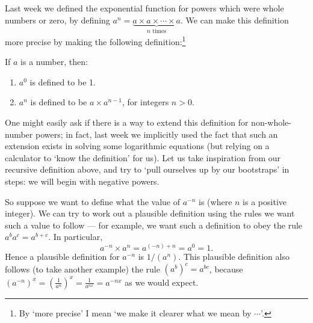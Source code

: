 



Last week we defined the exponential function for powers which were whole numbers or zero, by
defining $ a^n = \underbrace{a \times a \times \cdots \times a}_{n \text{ times}} $. We can make
this definition more precise by making the following definition:\footnote{By `more precise' I mean `we make it clearer what we mean by $\cdots$'.}
\begin{defn}
  If $ a $ is a number, then:
  \begin{enumerate}
    \item $ a^0 $ is defined to be 1.
    \item $ a^n $ is defined to be $ a \times a^{n - 1} $, for integers $ n > 0 $.
  \end{enumerate}
\end{defn}

One might easily ask if there is a way to extend this definition for non-whole-number powers; in fact, last week we implicitly used the fact that such
an extension exists in solving some logarithmic equations (but relying on a calculator to `know the definition' for us). Let us take inspiration from
our recursive definition above, and try to `pull ourselves up by our bootstraps' in steps: we will begin with negative powers.

So suppose we want to define what the value of $ a^{-n} $ is (where $ n $ is a positive integer). We can try to work out a plausible definition using
the rules we want such a value to follow --- for example, we want such a definition to obey the rule $ a^b a^c = a^{b + c} $. In particular,
\begin{displaymath}
  a^{-n} \times a^n = a^{(-n) + n} = a^0 = 1.
\end{displaymath}
Hence a plausible definition for $ a^{-n} $ is $ 1/(a^n) $. This plausible definition also follows (to take another example) the rule $ (a^b)^c = a^{bc} $,
because $ (a^{-n})^{x} = \left(\frac{1}{a^n}\right)^x = \frac{1}{a^{nx}} = a^{-nx} $ as we would expect.

